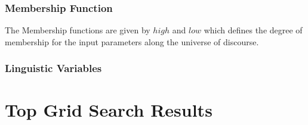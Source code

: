 \documentclass[10pt,journal,compsoc]{IEEEtran}
\begin{document}
\subsubsection{Membership Function} 
The Membership functions are given by $high$ and $low$ which defines the degree of
membership for the input parameters along the universe of discourse. 
\subsubsection*{Linguistic Variables} 
\appendices

\section{Top Grid Search Results}\label{app:models}

\end{document}
